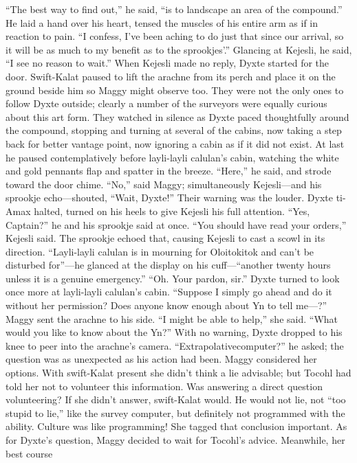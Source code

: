 \documentclass[9pt]{article}
\begin{document}
“The best way to find out,” he said, “is to landscape an area of the compound.” He laid a hand over
his heart, tensed the muscles of his entire arm as if in reaction to pain. “I confess, I’ve been aching to do
just that since our arrival, so it will be as much to my benefit as to the sprookjes’.” Glancing at Kejesli, he
said, “I see no reason to wait.”
When Kejesli made no reply, Dyxte started for the door. Swift-Kalat paused to lift the arachne from
its perch and place it on the ground beside him so Maggy might observe too. They were not the only
ones to follow Dyxte outside; clearly a number of the surveyors were equally curious about this art form.
They watched in silence as Dyxte paced thoughtfully around the compound, stopping and turning at
several of the cabins, now taking a step back for better vantage point, now ignoring a cabin as if it did not
exist.
At last he paused contemplatively before layli-layli calulan’s cabin, watching the white and gold
pennants flap and spatter in the breeze. “Here,” he said, and strode toward the door chime.
“No,” said Maggy; simultaneously Kejesli—and his sprookje echo—shouted, “Wait, Dyxte!”
Their warning was the louder. Dyxte ti-Amax halted, turned on his heels to give Kejesli his full
attention. “Yes, Captain?” he and his sprookje said at once.
“You should have read your orders,” Kejesli said. The sprookje echoed that, causing Kejesli to cast
a scowl in its direction. “Layli-layli calulan is in mourning for Oloitokitok and can’t be disturbed
for”—he glanced at the display on his cuff—“another twenty hours unless it is a genuine emergency.”
“Oh. Your pardon, sir.” Dyxte turned to look once more at layli-layli calulan’s cabin. “Suppose I
simply go ahead and do it without her permission? Does anyone know enough about Yn to tell me—?”
Maggy sent the arachne to his side. “I might be able to help,” she said. “What would you like to
know about the Yn?”
With no warning, Dyxte dropped to his knee to peer into the arachne’s camera. “Extrapolativecomputer?” he asked; the question was as unexpected as his action had been.
Maggy considered her options. With swift-Kalat present she didn’t think a lie advisable; but Tocohl
had told her not to volunteer this information. Was answering a direct question volunteering? If she didn’t
answer, swift-Kalat would. He would not lie, not “too stupid to lie,” like the survey computer, but
definitely not programmed with the ability. Culture was like programming! She tagged that conclusion
important.
As for Dyxte’s question, Maggy decided to wait for Tocohl’s advice. Meanwhile, her best course
\end{document}
